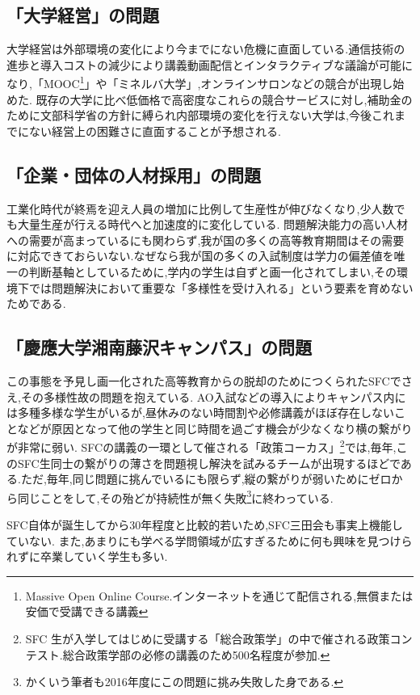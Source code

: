 \documentclass[uplatex, a4j]{jsarticle}
\begin{document}
\subsection{「大学経営」の問題}
  大学経営は外部環境の変化により今までにない危機に直面している.通信技術の進歩と導入コストの減少により講義動画配信とインタラクティブな議論が可能になり,「MOOC\footnote{Massive Open Online Course.インターネットを通じて配信される,無償または安価で受講できる講義}\cite{mooc}」や「ミネルバ大学」,オンラインサロンなどの競合が出現し始めた.
  既存の大学に比べ低価格で高密度なこれらの競合サービスに対し,補助金のために文部科学省の方針に縛られ内部環境の変化を行えない大学\cite{kakuitsu}は,今後これまでにない経営上の困難さに直面することが予想される.


\subsection{「企業・団体の人材採用」の問題}
  工業化時代が終焉を迎え人員の増加に比例して生産性が伸びなくなり,少人数でも大量生産が行える時代へと加速度的に変化している.
  問題解決能力の高い人材への需要が高まっているにも関わらず,我が国の多くの高等教育期間はその需要に対応できておらいない.なぜなら我が国の多くの入試制度は学力の偏差値を唯一の判断基軸としているために,学内の学生は自ずと画一化されてしまい\cite{kakuitsu},その環境下では問題解決において重要な「多様性を受け入れる」\cite{harvard}という要素を育めないためである.


\subsection{「慶應大学湘南藤沢キャンパス」の問題}
  この事態を予見し画一化された高等教育からの脱却のためにつくられたSFC\cite{kakuitsu}でさえ,その多様性故の問題を抱えている.
  AO入試などの導入によりキャンパス内には多種多様な学生がいるが,昼休みのない時間割や必修講義がほぼ存在しないことなどが原因となって他の学生と同じ時間を過ごす機会が少なくなり横の繋がりが非常に弱い.
  SFCの講義の一環として催される「政策コーカス」\footnote{SFC
  生が入学してはじめに受講する「総合政策学」の中で催される政策コンテスト.総合政策学部の必修の講義のため500名程度が参加.}では,毎年,このSFC生同士の繋がりの薄さを問題視し解決を試みるチームが出現するほどである.ただ,毎年,同じ問題に挑んでいるにも限らず,縦の繋がりが弱いためにゼロから同じことをして,その殆どが持続性が無く失敗\footnote{かくいう筆者も2016年度にこの問題に挑み失敗した身である.}に終わっている.

  SFC自体が誕生してから30年程度と比較的若いため,SFC三田会も事実上機能していない.\cite{diamond}
  また,あまりにも学べる学問領域が広すぎるために何も興味を見つけられずに卒業していく学生も多い.
\end{document}
